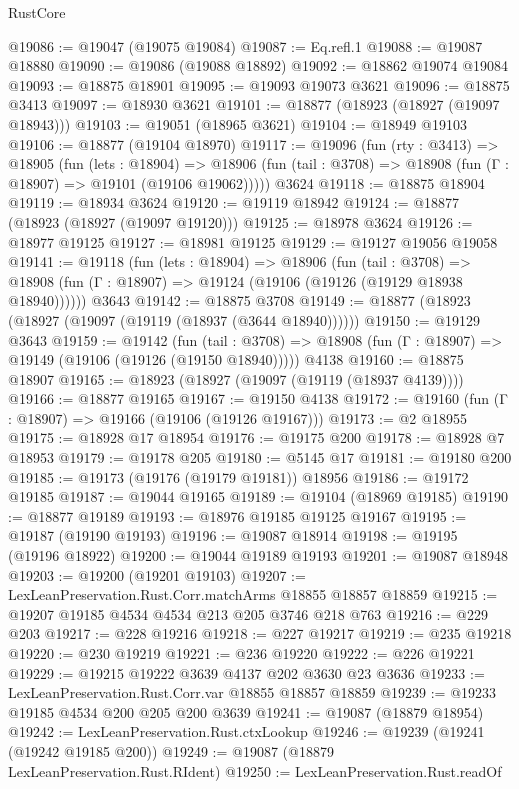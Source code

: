 \begin{lexlean}{RustCore}
\begin{coremodule}
@19086 := @19047 (@19075 @19084)
@19087 := Eq.refl.{1}
@19088 := @19087 @18880
@19090 := @19086 (@19088 @18892)
@19092 := @18862 @19074 @19084
@19093 := @18875 @18901
@19095 := @19093 @19073 @3621
@19096 := @18875 @3413
@19097 := @18930 @3621
@19101 := @18877 (@18923 (@18927 (@19097 @18943)))
@19103 := @19051 (@18965 @3621)
@19104 := @18949 @19103
@19106 := @18877 (@19104 @18970)
@19117 := @19096
    (fun (rty : @3413) =>
    @18905
      (fun (lets : @18904) =>
      @18906 (fun (tail : @3708) => @18908 (fun (Γ : @18907) => @19101 (@19106 @19062)))))
    @3624
@19118 := @18875 @18904
@19119 := @18934 @3624
@19120 := @19119 @18942
@19124 := @18877 (@18923 (@18927 (@19097 @19120)))
@19125 := @18978 @3624
@19126 := @18977 @19125
@19127 := @18981 @19125
@19129 := @19127 @19056 @19058
@19141 := @19118
    (fun (lets : @18904) =>
    @18906
      (fun (tail : @3708) =>
      @18908 (fun (Γ : @18907) => @19124 (@19106 (@19126 (@19129 @18938 @18940))))))
    @3643
@19142 := @18875 @3708
@19149 := @18877 (@18923 (@18927 (@19097 (@19119 (@18937 (@3644 @18940))))))
@19150 := @19129 @3643
@19159 := @19142
    (fun (tail : @3708) => @18908 (fun (Γ : @18907) => @19149 (@19106 (@19126 (@19150 @18940)))))
    @4138
@19160 := @18875 @18907
@19165 := @18923 (@18927 (@19097 (@19119 (@18937 @4139))))
@19166 := @18877 @19165
@19167 := @19150 @4138
@19172 := @19160 (fun (Γ : @18907) => @19166 (@19106 (@19126 @19167)))
@19173 := @2 @18955
@19175 := @18928 @17 @18954
@19176 := @19175 @200
@19178 := @18928 @7 @18953
@19179 := @19178 @205
@19180 := @5145 @17
@19181 := @19180 @200
@19185 := @19173 (@19176 (@19179 @19181)) @18956
@19186 := @19172 @19185
@19187 := @19044 @19165
@19189 := @19104 (@18969 @19185)
@19190 := @18877 @19189
@19193 := @18976 @19185 @19125 @19167
@19195 := @19187 (@19190 @19193)
@19196 := @19087 @18914
@19198 := @19195 (@19196 @18922)
@19200 := @19044 @19189 @19193
@19201 := @19087 @18948
@19203 := @19200 (@19201 @19103)
@19207 := LexLeanPreservation.Rust.Corr.matchArms @18855 @18857 @18859
@19215 := @19207 @19185 @4534 @4534 @213 @205 @3746 @218 @763
@19216 := @229 @203
@19217 := @228 @19216
@19218 := @227 @19217
@19219 := @235 @19218
@19220 := @230 @19219
@19221 := @236 @19220
@19222 := @226 @19221
@19229 := @19215 @19222 @3639 @4137 @202 @3630 @23 @3636
@19233 := LexLeanPreservation.Rust.Corr.var @18855 @18857 @18859
@19239 := @19233 @19185 @4534 @200 @205 @200 @3639
@19241 := @19087 (@18879 @18954)
@19242 := LexLeanPreservation.Rust.ctxLookup
@19246 := @19239 (@19241 (@19242 @19185 @200))
@19249 := @19087 (@18879 LexLeanPreservation.Rust.RIdent)
@19250 := LexLeanPreservation.Rust.readOf

\end{coremodule}
\end{lexlean}
